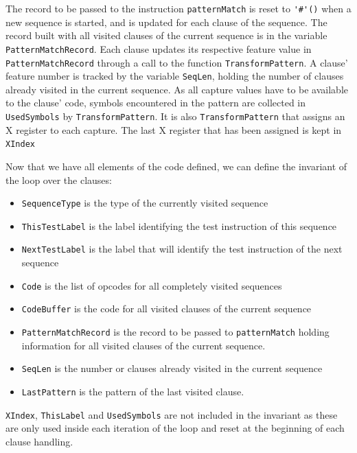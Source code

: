 \documentclass[a4paper]{memoir}
\begin{document}
The record to be passed to the instruction \lstinline!patternMatch! is reset to
\lstinline!'#'()! when a new sequence is started, and is updated for each clause
of the sequence. The record built with all visited clauses of the current
sequence is in the variable \lstinline!PatternMatchRecord!.
Each clause updates its respective feature value in
\lstinline!PatternMatchRecord! through a call to the function \lstinline!TransformPattern!.
A clause' feature number is tracked by the
variable \lstinline!SeqLen!, holding the number of clauses already visited in
the current sequence.
As all capture values have to be available to the clause' code, symbols encountered
in the pattern are collected in \lstinline!UsedSymbols! by
\lstinline!TransformPattern!. It is also \lstinline!TransformPattern! that
assigns an X register to each capture. The last X register that has been
assigned is kept in \lstinline!XIndex!

Now that we have all elements of the code defined, we can define the invariant
of the loop over the clauses:

\begin{itemize}
  \item \lstinline!SequenceType! is the type of the currently visited sequence 
  \item \lstinline!ThisTestLabel! is the label identifying the test instruction of this sequence
  \item \lstinline!NextTestLabel! is the label that will identify the test
    instruction of the next sequence
  \item \lstinline!Code! is the list of opcodes for all completely visited sequences
  \item \lstinline!CodeBuffer! is the code for all visited clauses of the current sequence
  \item \lstinline!PatternMatchRecord! is the record to be passed to \lstinline!patternMatch!
        holding information for all visited clauses of the current sequence.
  \item \lstinline!SeqLen! is the number or clauses already visited in the current sequence
  \item \lstinline!LastPattern! is the pattern of the last visited clause.
\end{itemize}

\lstinline!XIndex!, \lstinline!ThisLabel! and \lstinline!UsedSymbols! are not
included in the invariant as these are only used inside
each iteration of the loop and reset at the beginning of each clause handling.
\end{document}
